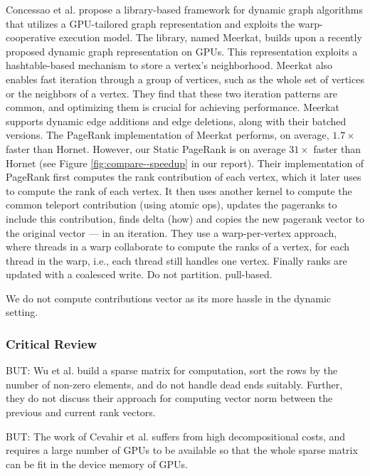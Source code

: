 Concessao et al. \cite{concessao2023meerkat} propose a library-based framework for dynamic graph algorithms that utilizes a GPU-tailored graph representation and exploits the warp-cooperative execution model. The library, named Meerkat, builds upon a recently proposed dynamic graph representation on GPUs. This representation exploits a hashtable-based mechanism to store a vertex’s neighborhood. Meerkat also enables fast iteration through a group of vertices, such as the whole set of vertices or the neighbors of a vertex. They find that these two iteration patterns are common, and optimizing them is crucial for achieving performance. Meerkat supports dynamic edge additions and edge deletions, along with their batched versions. The PageRank implementation of Meerkat performs, on average, $1.7\times$ faster than Hornet. However, our Static PageRank is on average $31\times$ faster than Hornet (see Figure \ref{fig:compare--speedup} in our report).
Their implementation of PageRank first computes the rank contribution of each vertex, which it later uses to compute the rank of each vertex. It then uses another kernel to compute the common teleport contribution (using atomic ops), updates the pageranks to include this contribution,  finds delta (how) and copies the new pagerank vector to the original vector --- in an iteration. They use a warp-per-vertex approach, where threads in a warp collaborate to compute the ranks of a vertex, for each thread in the warp, i.e., each thread still handles one vertex. Finally ranks are updated with a coalesced write. Do not partition. pull-based.

We do not compute contributions vector as its more hassle in the dynamic setting.



\subsubsection{Critical Review}

BUT: Wu et al. \cite{rank-wu10} build a sparse matrix for computation, sort the rows by the number of non-zero elements, and do not handle dead ends suitably. Further, they do not discuss their approach for computing vector norm between the previous and current rank vectors.

BUT: The work of Cevahir et al. \cite{cevahir2010efficient} suffers from high decompositional costs, and requires a large number of GPUs to be available so that the whole sparse matrix can be fit in the device memory of GPUs.

